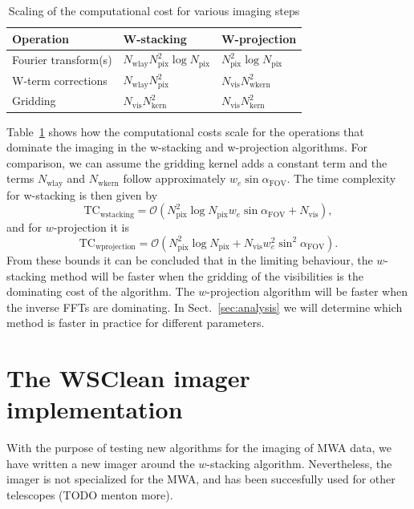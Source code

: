 \documentclass[useAMS,usenatbib]{mn2e}
\begin{document}
\begin{table}[h]
 \caption{Scaling of the computational cost for various imaging steps} \label{tbl:computational-cost-per-operation}
 \begin{tabular}{lll}
   \textbf{Operation} & \textbf{W-stacking} & \textbf{W-projection} \\
   \hline\hline
   Fourier transform(s) & $N_\textrm{wlay} N^2_\textrm{pix} \log N_\textrm{pix}$ & $N^2_\textrm{pix} \log N_\textrm{pix}$ \\
   W-term corrections   & $N_\textrm{wlay} N^2_\textrm{pix}$ & $N_\textrm{vis} N^2_\textrm{wkern}$ \\
   Gridding & $N_\textrm{vis}N^2_\textrm{kern}$ & $N_\textrm{vis} N_\textrm{kern}^2$ \\
   \hline\hline
 \end{tabular}
\end{table}

Table~\ref{tbl:computational-cost-per-operation} shows how the computational costs scale for the operations that dominate the imaging in the w-stacking and w-projection algorithms. For comparison, we can assume the gridding kernel adds a constant term and the terms $N_\textrm{wlay}$ and $N_\textrm{wkern}$ follow approximately $w_e \sin \alpha_\textrm{FOV}$. The time complexity for w-stacking is then given by
\begin{equation}
\textrm{TC}_\textrm{wstacking}=\mathcal{O}\left(N^2_\textrm{pix} \log N_\textrm{pix} w_e \sin \alpha_\textrm{FOV}+ N_\textrm{vis} \right),
\end{equation}
and for $w$-projection it is
\begin{equation}
\textrm{TC}_\textrm{wprojection}=\mathcal{O}\left(N^2_\textrm{pix} \log N_\textrm{pix} + N_\textrm{vis} w_e^2 \sin^2 \alpha_\textrm{FOV}\right).
\end{equation}
From these bounds it can be concluded that in the limiting behaviour, the $w$-stacking method will be faster when the gridding of the visibilities is the dominating cost of the algorithm. The $w$-projection algorithm will be faster when the inverse FFTs are dominating. In Sect.~\ref{sec:analysis} we will determine which method is faster in practice for different parameters.

\section{The WSClean imager implementation} \label{sec:implementation}
With the purpose of testing new algorithms for the imaging of MWA data, we have written a new imager around the $w$-stacking algorithm. Nevertheless, the imager is not specialized for the MWA, and has been succesfully used for other telescopes (TODO menton more).
\end{document}
